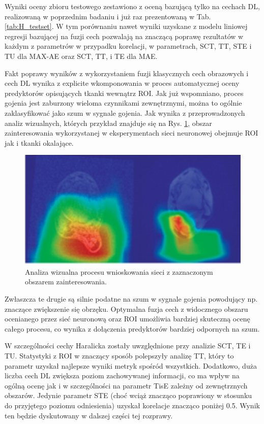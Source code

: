 \begin{table}[h]
\begin{center}
\begin{tabular}{lc||c|c|c|c|c|c}
		\end{tabular}
	\end{center}
	\label{tab:testset}
\end{table}

Wyniki oceny zbioru testowego zestawiono z oceną bazującą tylko na cechach DL, realizowaną w poprzednim badaniu i już raz prezentowaną w Tab. \ref{tab:H_testset}. W tym porównaniu nawet wyniki uzyskane z modelu liniowej regresji bazującej na fuzji cech pozwalają na znaczącą poprawę rezultatów w każdym z parametrów w przypadku korelacji, w parametrach, SCT, TT, STE i TU dla MAX-AE oraz SCT, TT, i TE dla MAE. 

Fakt poprawy wyników z wykorzystaniem fuzji klasycznych cech obrazowych i cech DL wynika z explicite wkomponowania w proces automatycznej oceny predyktorów opisujących tkanki wewnątrz ROI. Jak już wspomniano, proces gojenia jest zaburzony wieloma czynnikami zewnętrznymi, można to ogólnie zaklasyfikować jako szum w sygnale gojenia. Jak wynika z przeprowadzonych analiz wizualnych, których przykład znajduje się na Rys. \ref{fig:XAI}, obszar zainteresowania  wykorzystanej w eksperymentach sieci neuronowej obejmuje ROI jak i tkanki okalające.  
\begin{figure}[h]
	\centering
	\includegraphics[width=1\textwidth]{figures/XAI.png}
	\caption{Analiza wizualna procesu wnioskowania sieci z zaznaczonym obszarem zainteresowania.}\label{fig:XAI}
\end{figure}
Zwłaszcza te drugie są silnie podatne na szum w sygnale gojenia powodujący np. znaczące zwiększenie się obrzęku. 
Optymalna fuzja cech z widocznego obszaru ocenianego przez sieć neuronową oraz ROI umożliwia bardziej skuteczną ocenę całego procesu, co wynika z dołączenia predyktorów bardziej odpornych na szum. 

W szczególności cechy Haralicka zostały uwzględnione przy analizie SCT, TE i TU. Statystyki z ROI w znaczący sposób polepszyły analizę TT, który to parametr uzyskał najlepsze wyniki metryk spośród wszystkich. Dodatkowo, duża liczba cech DL zwiększa poziom zachowywanej informacji, co ma wpływ na ogólną ocenę jak i w szczególności na parametr TisE zależny od zewnętrznych obszarów. Jedynie parametr STE (choć wciąż znacząco poprawiony w stosunku do przyjętego poziomu odniesienia) uzyskał korelacje znacząco poniżej 0.5. Wynik ten będzie dyskutowany w dalszej części tej rozprawy.
 
